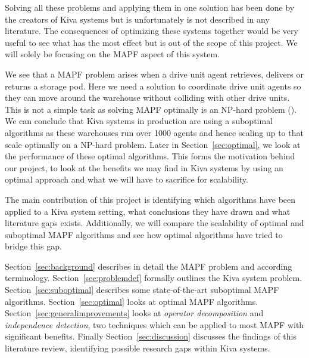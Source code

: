 \documentclass[a4paper,11pt]{article}
\begin{document}
Solving all these problems and applying them in one solution has been done by the creators of Kiva systems but is unfortunately is not described in any literature. The consequences of optimizing these systems together would be very useful to see what has the most effect but is out of the scope of this project. We will solely be focusing on the MAPF aspect of this system.

We see that a MAPF problem arises when a drive unit agent retrieves, delivers or returns a storage pod. Here we need a solution to coordinate drive unit agents so they can move around the warehouse without colliding with other drive units. This is not a simple task as solving MAPF optimally is an NP-hard problem (\cite{yu2013structure}). We can conclude that Kiva systems in production are using a suboptimal algorithms as these warehouses run over 1000 agents and hence scaling up to that scale optimally on a NP-hard problem. Later in Section~\ref{sec:optimal}, we look at the performance of these optimal algorithms. This forms the motivation behind our project, to look at the benefits we may find in Kiva systems by using an optimal approach and what we will have to sacrifice for scalability.

The main contribution of this project is identifying which algorithms have been applied to a Kiva system setting, what conclusions they have drawn and what literature gaps exists. Additionally, we will compare the scalability of optimal and suboptimal MAPF algorithms and see how optimal algorithms have tried to bridge this gap.

Section~\ref{sec:background} describes in detail the MAPF problem and according terminology. Section~\ref{sec:problemdef} formally outlines the Kiva system problem. Section~\ref{sec:suboptimal} describes some state-of-the-art suboptimal MAPF algorithms. Section~\ref{sec:optimal} looks at optimal MAPF algorithms. Section~\ref{sec:generalimprovements} looks at \textit{operator decomposition} and \textit{independence detection}, two techniques which can be applied to most MAPF with significant benefits. Finally Section~\ref{sec:discussion} discusses the findings of this literature review, identifying possible research gaps within Kiva systems.

\end{document}
